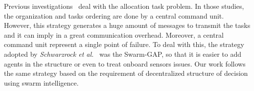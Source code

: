 Previous investigations~\cite{ferreira2007swarm,scerri2005allocatingLADCOP, ferreira2010robocup,ikemoto2010adaptive} deal with the allocation task problem. In those studies, the organization and tasks ordering are done by a central command unit. However, this strategy generates a huge amount of messages to transmit the tasks and it can imply in a great communication overhead. Moreover, a central command unit represent a single point of failure. To deal with this, the strategy adopted by \textit{Schwarzrock et al.}~\cite{MAS07} was the Swarm-GAP, so that it is easier to add agents in the structure or even to treat onboard sensors issues. Our work follows the same strategy based on the requirement of decentralized structure of decision using swarm intelligence.